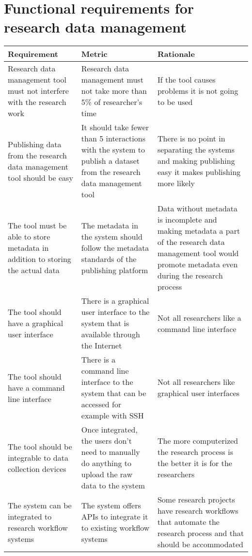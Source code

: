 \pagebreak

\section{Functional requirements for research data management}

\tabcolsep=0.11cm
\begin{tabularx}{\textwidth}{| >{\raggedright}p{3cm} | >{\raggedright}p{3cm} | X |}
    \hline
    \textbf{Requirement} & \textbf{Metric}& \textbf{Rationale} \\
    \hline
    \rowcolor{Gray}
    Research data management tool must not interfere with the research work    &Research data management must not take more than 5\% of researcher’s time & If the tool causes problems it is not going to be used\\
    \hline
    Publishing data from the research data management tool should be easy&It should take fewer than 5 interactions with the system to publish a dataset from the research data management tool &There is no point in separating the systems and making publishing easy it makes publishing more likely\\
    \hline
    \rowcolor{Gray}
    The tool must be able to store metadata in addition to storing the actual data  &The metadata in the system should follow the metadata standards of the publishing platform&Data without metadata is incomplete and making metadata a part of the research data management tool would promote metadata even during the research process\\
    \hline
    The tool should have a graphical user interface  &There is a graphical user interface to the system that is available through the Internet & Not all researchers like a command line interface\\
    \hline
    \rowcolor{Gray}
    The tool should have a command line interface        &There is a command line interface to the system that can be accessed for example with SSH & Not all researchers like graphical user interfaces\\
    \hline
    The tool should be integrable to data collection devices  & Once integrated, the users don’t need to manually do anything to upload the raw data to the system & The more computerized the research process is the better it is for the researchers\\
    \hline
    \rowcolor{Gray}
    The system can be integrated to research workflow systems   &The system offers APIs to integrate it to existing workflow systems& Some research projects have research workflows that automate the research process and that should be accommodated\\

\end{tabularx}

